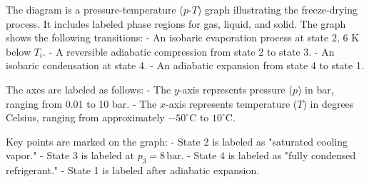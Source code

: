 The diagram is a pressure-temperature (\(p\)-\(T\)) graph illustrating the freeze-drying process. It includes labeled phase regions for gas, liquid, and solid. The graph shows the following transitions:  
- An isobaric evaporation process at state 2, 6 K below \(T_i\).  
- A reversible adiabatic compression from state 2 to state 3.  
- An isobaric condensation at state 4.  
- An adiabatic expansion from state 4 to state 1.  

The axes are labeled as follows:  
- The \(y\)-axis represents pressure (\(p\)) in bar, ranging from 0.01 to 10 bar.  
- The \(x\)-axis represents temperature (\(T\)) in degrees Celsius, ranging from approximately \(-50^\circ\text{C}\) to \(10^\circ\text{C}\).  

Key points are marked on the graph:  
- State 2 is labeled as "saturated cooling vapor."  
- State 3 is labeled at \(p_3 = 8 \, \text{bar}\).  
- State 4 is labeled as "fully condensed refrigerant."  
- State 1 is labeled after adiabatic expansion.